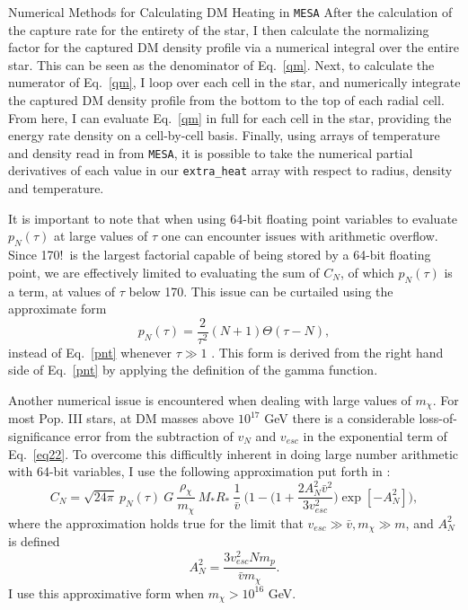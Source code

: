 \documentclass[a4paper,11pt]{article}
\begin{document}
\begin{section}{Numerical Methods for Calculating DM Heating in \texttt{MESA}}
    After the calculation of the capture rate for the entirety of the star, I then calculate the normalizing factor for the captured DM density profile via a numerical integral over the entire star.
    This can be seen as the denominator of Eq.~\ref{qm}.
    Next, to calculate the numerator of Eq.~\ref{qm}, I loop over each cell in the star, and numerically integrate the captured DM density profile from the bottom to the top of each radial cell.
    From here, I can evaluate Eq.~\ref{qm} in full for each cell in the star, providing the energy rate density on a cell-by-cell basis.
    Finally, using arrays of temperature and density read in from \texttt{MESA}, it is possible to take the numerical partial derivatives of each value in our \texttt{extra\_heat} array with respect to radius, density and temperature.

    It is important to note that when using 64-bit floating point variables to evaluate $p_N(\tau)$ at large values of $\tau$ one can encounter issues with arithmetic overflow.
    Since 170!~is the largest factorial capable of being stored by a 64-bit floating point, we are effectively limited to evaluating the sum of $C_N$, of which $p_N(\tau)$ is a term, at values of $\tau$ below 170.
    This issue can be curtailed using the approximate form
    \begin{equation}
        p_N(\tau)  = \frac{2}{\tau^2} (N+1) \Theta(\tau - N),
    \end{equation}
    instead of Eq.~\ref{pnt} whenever $\tau \gg 1$ \cite{Ilie:2020popiii}.
    This form is derived from the right hand side of Eq.~\ref{pnt} by applying the definition of the gamma function.



    Another numerical issue is encountered when dealing with large values of $m_{\chi}$. 
    For most Pop. III stars, at DM masses above $10^{17}$ GeV there is a considerable loss-of-significance error from the subtraction of $v_N$ and $v_{esc}$ in the exponential term of Eq.~\ref{eq22}.
    To overcome this difficultly inherent in doing large number arithmetic with 64-bit variables, I use the following approximation put forth in \cite{Bramante:2017}:
    \begin{equation}
        C_N = \sqrt{24 \pi}~ p_N(\tau) ~ G ~ \frac{\rho_{\chi}}{m_{\chi}} ~M_{*} R_{*} ~\frac{1}{\bar{v}}~ \Bigg(1 - \Big(1 + \frac{2A_N^2 \bar{v}^2}{3v_{esc}^2}\Big)\exp[-A_N^2] \Bigg), 
    \end{equation}
    where the approximation holds true for the limit that $v_{esc} \gg \bar{v}, m_{\chi} \gg m$, and $A_N^2$ is defined
    $$A_N^2 = \frac{3v_{esc}^2 N m_p}{\bar{v} m_{\chi}}.$$
    I use this approximative form when $m_{\chi} > 10^{16}$ GeV.
\end{section}
\end{document}
